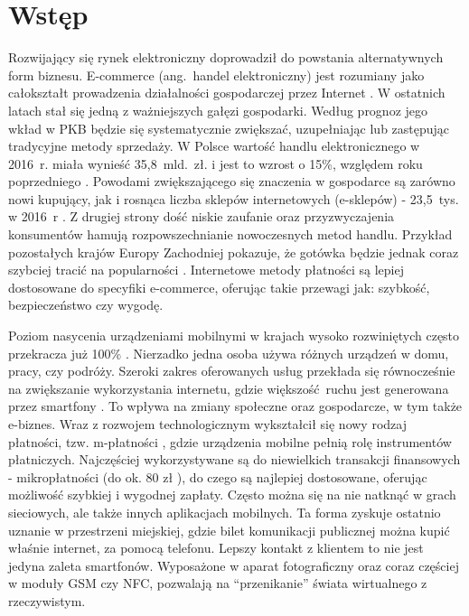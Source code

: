 \section*{Wstęp}

Rozwijający się rynek elektroniczny doprowadził do powstania alternatywnych form biznesu. E-commerce (ang.~handel elektroniczny) \cite{biblia_ebiznesu} jest rozumiany jako całokształt prowadzenia działalności gospodarczej przez Internet \cite{pieniadz_elektroniczny-analiza}. W ostatnich latach stał się jedną z ważniejszych gałęzi gospodarki. Według prognoz jego wkład w PKB będzie się systematycznie zwiększać, uzupełniając lub zastępując tradycyjne metody sprzedaży. W Polsce wartość handlu elektronicznego w 2016~r. miała wynieść 35,8~mld.~zł. i jest to wzrost o 15\%, względem roku poprzedniego \cite{barometr_radio}. Powodami zwiększającego się znaczenia w gospodarce są zarówno nowi kupujący, jak i rosnąca liczba sklepów internetowych (e-sklepów) - 23,5~tys. w 2016~r \cite{barometr_radio}. Z drugiej strony dość niskie zaufanie oraz przyzwyczajenia konsumentów hamują rozpowszechnianie nowoczesnych metod handlu. Przykład pozostałych krajów Europy Zachodniej pokazuje, że gotówka będzie jednak coraz szybciej tracić na popularności \cite{pieniadz_elektroniczny-analiza}. Internetowe metody płatności są lepiej dostosowane do specyfiki e-commerce, oferując takie przewagi jak: szybkość, bezpieczeństwo czy wygodę.

Poziom nasycenia urządzeniami mobilnymi w krajach wysoko rozwiniętych często przekracza już 100\% \cite{biblia_ebiznesu}. Nierzadko jedna osoba używa różnych urządzeń w domu, pracy, czy podróży. Szeroki zakres oferowanych usług przekłada się równocześnie na zwiększanie wykorzystania internetu, gdzie większość ruchu jest generowana przez smartfony \cite{ruch_mobilny-internet}. To wpływa na zmiany społeczne oraz gospodarcze, w tym także e-biznes. Wraz z rozwojem technologicznym wykształcił się nowy rodzaj płatności, tzw. m-płatności \cite{biblia_ebiznesu}, gdzie urządzenia mobilne pełnią rolę instrumentów płatniczych. Najczęściej wykorzystywane są do niewielkich transakcji finansowych - mikropłatności (do ok. 80 zł \cite{elektroniczne_metody_platnosci}), do czego są najlepiej dostosowane, oferując możliwość szybkiej i wygodnej zapłaty. Często można się na nie natknąć w grach sieciowych, ale także innych aplikacjach mobilnych. Ta forma zyskuje ostatnio uznanie w przestrzeni miejskiej, gdzie bilet komunikacji publicznej można kupić właśnie internet, za pomocą telefonu. Lepszy kontakt z klientem to nie jest jedyna zaleta smartfonów. Wyposażone w aparat fotograficzny oraz coraz częściej w moduły GSM czy NFC, pozwalają na ``przenikanie'' świata wirtualnego z rzeczywistym. 

